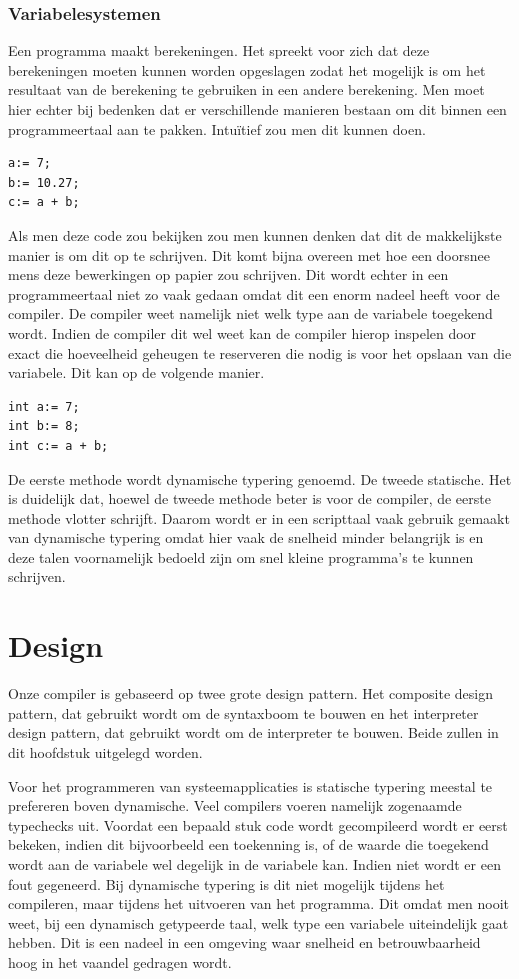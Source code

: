 \documentclass[11pt,a4paper]{article}
\begin{document}
\subsubsection{Variabelesystemen}
Een programma maakt berekeningen. Het spreekt voor zich dat deze berekeningen moeten kunnen worden opgeslagen zodat het mogelijk is om het resultaat van de berekening te gebruiken in een andere berekening. Men moet hier echter bij bedenken dat er verschillende manieren bestaan om dit binnen een programmeertaal aan te pakken. Intuïtief zou men dit kunnen doen.

\begin{verbatim}
a:= 7;
b:= 10.27;
c:= a + b;
\end{verbatim}

Als men deze code zou bekijken zou men kunnen denken dat dit de makkelijkste manier is om dit op te schrijven. Dit komt bijna overeen met hoe een doorsnee mens deze bewerkingen op papier zou schrijven. Dit wordt echter in een programmeertaal niet zo vaak gedaan omdat dit een enorm nadeel heeft voor de compiler. De compiler weet namelijk niet welk type aan de variabele toegekend wordt. Indien de compiler dit wel weet kan de compiler hierop inspelen door exact die hoeveelheid geheugen te reserveren die nodig is voor het opslaan van die variabele. Dit kan op de volgende manier.

\begin{verbatim}
int a:= 7;
int b:= 8;
int c:= a + b;
\end{verbatim}

De eerste methode wordt dynamische typering genoemd. De tweede statische. Het is duidelijk dat, hoewel de tweede methode beter is voor de compiler, de eerste methode vlotter schrijft. Daarom wordt er in een scripttaal vaak gebruik gemaakt van dynamische typering omdat hier vaak de snelheid minder belangrijk is en deze talen voornamelijk bedoeld zijn om snel kleine programma's te kunnen schrijven.  

\section{Design}
Onze compiler is gebaseerd op twee grote design pattern. Het composite design pattern, dat gebruikt wordt om de syntaxboom te bouwen en het interpreter design pattern, dat gebruikt wordt om de interpreter te bouwen. Beide zullen in dit hoofdstuk uitgelegd worden.

Voor het programmeren van systeemapplicaties is statische typering meestal te prefereren boven dynamische. Veel compilers voeren namelijk zogenaamde typechecks uit. Voordat een bepaald stuk code wordt gecompileerd wordt er eerst bekeken, indien dit bijvoorbeeld een toekenning is, of de waarde die toegekend wordt aan de variabele wel degelijk in de variabele kan. Indien niet wordt er een fout gegeneerd. Bij dynamische typering is dit niet mogelijk tijdens het compileren, maar tijdens het uitvoeren van het programma. Dit omdat men nooit weet, bij een dynamisch getypeerde taal, welk type een variabele uiteindelijk gaat hebben. Dit is een nadeel in een omgeving waar snelheid en betrouwbaarheid hoog in het vaandel gedragen wordt. 
\end{document}
